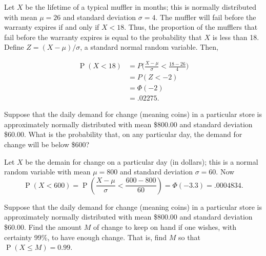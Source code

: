 \documentclass[answers,11pt]{exam}
\DeclareMathOperator*{\Prob}{P}
\renewcommand{\Pr}{\Prob}
\begin{document}
\begin{questions}
\begin{solution}
Let $X$ be the lifetime of a typical muffler in months; this is normally distributed
with mean $\mu = 26$ and standard deviation $\sigma = 4$.  The muffler will
fail before the warranty expires if and only if $X < 18$.  Thus,
the proportion of the mufflers that fail before the warranty expires is
equal to the probability that $X$ is less than 18.  Define $Z = (X -
\mu)/\sigma$, a standard normal random variable.  Then,

\begin{align*}
  \Pr(X < 18) &= P\Big(\frac{X - \mu}{\sigma} < \frac{18-26}{4}\Big) \\
  	&= P(Z < -2) \\
	&= \Phi(-2) \\
	&= .02275.
\end{align*}
\end{solution}



\question Suppose that the daily demand for change (meaning coins) in a
particular store is approximately normally distributed with mean \$800.00 and
standard deviation \$60.00.  What is the probability that, on any particular
day, the demand for change will be below \$600?

\begin{solution}
Let $X$ be the demain for change on a particular day (in dollars); this is a
normal random variable with mean $\mu = 800$ and standard deviation $\sigma =
60$.  Now
\[
  \Pr(X < 600) = \Pr\left(\frac{X - \mu}{\sigma} < \frac{600 - 800}{60}\right)
  = \Phi(-3.3) = .0004834.
\]
\end{solution}




\newpage






\question Suppose that the daily demand for change (meaning coins) in a
particular store is approximately normally distributed with mean \$800.00 and
standard deviation \$60.00.  Find the amount $M$ of change to keep on hand if
one wishes, with certainty 99\%, to have enough change.  That is, find $M$ so
that $\Pr(X \leq M) = 0.99$.


\end{questions}
\end{document}

